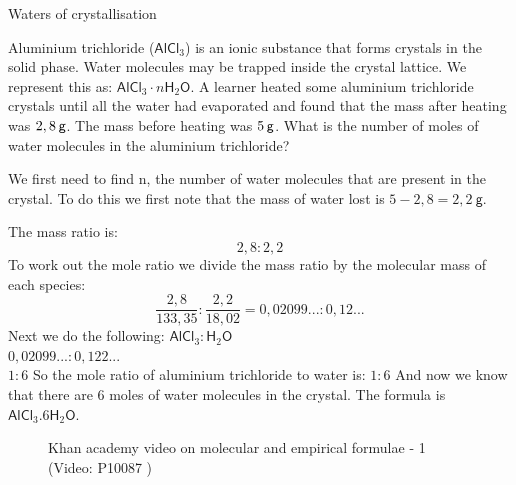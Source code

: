       \begin{wex}{Waters of crystallisation}{
\label{m38712*pid47982}
\label{m38712*id64827}Aluminium trichloride (${\mathsf{AlCl}}_{3}$) is an ionic substance that forms crystals in the solid phase. Water molecules may be trapped inside the crystal lattice. We represent this as: ${\mathsf{AlCl}}_{3}\ensuremath{\cdot}n{\mathsf{H}}_{2}\mathsf{O}$. A learner heated some aluminium trichloride crystals until all the water had evaporated and found that the mass after heating was $2,8\phantom{\rule{2pt}{0ex}}\mathsf{g}$. The mass before heating was $5\phantom{\rule{2pt}{0ex}}\mathsf{g}$. What is the number of moles of water molecules in the aluminium trichloride?\par 
\vspace{5pt}}
{
We first need to find n, the number of water molecules that are present in the crystal. To do this we first note that the mass of water lost is $5-2,8=2,2~\mathsf{g}$. \par
  \label{m38712*id3892}The mass ratio is:
 \label{m38712*eid744672}\nopagebreak\noindent{}
    \begin{equation*}
    2,8:2,2
      \end{equation*}
To work out the mole ratio we divide the mass ratio by the molecular mass of each species:
\label{m38712*eid7459432}\nopagebreak\noindent{}
    \begin{equation*}
    \frac{2,8}{133,35}:\frac{2,2}{18,02}=0,02099...:0,12...
      \end{equation*}
Next we do the following:
$\mathsf{AlCl}_{3}:\mathsf{H}_{2}\mathsf{O}$\\
$0,02099...:0,122...$ \\
$1:6$
So the mole ratio of aluminium trichloride to water is: $1:6$
And now we know that there are 6 moles of water molecules in the crystal. The formula is $\mathsf{AlCl}_{3}.6\mathsf{H}_{2}\mathsf{O}$.
}
    \end{wex}
    \noindent
\label{m38712*eip-762}
    \setcounter{subfigure}{0}
	\begin{figure}[H] %
    \textnormal{Khan academy video on molecular and empirical formulae - 1}\vspace{.1in} \nopagebreak
  \label{m38712*yt-media1}\label{m38712*yt-video1}
             { (Video:  P10087 )}
      \vspace{2pt}
    \vspace{.1in}
 \end{figure}       \par \label{m38712*eip-306}
